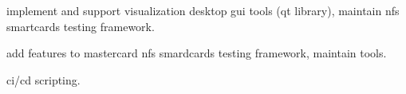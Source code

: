 \documentclass[10pt,a4paper,ragged2e,withhyper]{altacv}
\begin{document}

 implement and support visualization desktop gui tools (qt library),
maintain nfs smartcards testing framework.

 add features to mastercard nfs smardcards testing
framework, maintain tools.

 ci/cd scripting.

\divider

\divider


\end{document}
